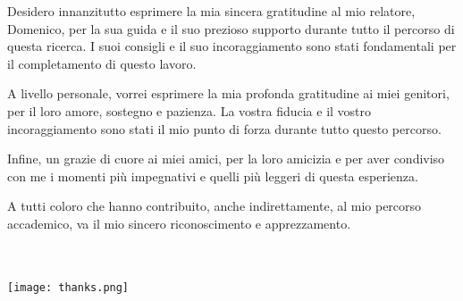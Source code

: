 
%

\begin{ntacknowledgements}

Desidero innanzitutto esprimere la mia sincera gratitudine al mio relatore, Domenico, per la sua guida e il suo prezioso supporto durante tutto il percorso di questa ricerca. I suoi consigli e il suo incoraggiamento sono stati fondamentali per il completamento di questo lavoro.

A livello personale, vorrei esprimere la mia profonda gratitudine ai miei genitori, per il loro amore, sostegno e pazienza. La vostra fiducia e il vostro incoraggiamento sono stati il mio punto di forza durante tutto questo percorso.

Infine, un grazie di cuore ai miei amici, per la loro amicizia e per aver condiviso con me i momenti più impegnativi e quelli più leggeri di questa esperienza.

A tutti coloro che hanno contribuito, anche indirettamente, al mio percorso accademico, va il mio sincero riconoscimento e apprezzamento.
\\
\\
\\

\begin{center}
	\texttt{[image: thanks.png]}
\end{center}


\end{ntacknowledgements}

